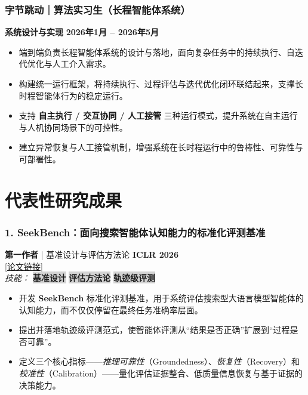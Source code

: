 \documentclass[10pt,a4paper]{article}
\newcommand{\skills}[1]{%
    \noindent\textit{\color{graytext}技能：}%
    \begingroup
    #1%
    \endgroup
}
\newcommand{\skilltag}[1]{%
    \setlength{\fboxsep}{3pt}%
    \setlength{\fboxrule}{0.5pt}%
    \colorbox{lightgray}{\color{itemcolor}\small\textbf{#1}}%
    \hspace{0.3em}%
}
\begin{document}
    \subsubsection*{\color{itemcolor}字节跳动｜算法实习生（长程智能体系统）}
    \noindent\textbf{\color{sectioncolor}系统设计与实现} \hfill \color{accentcolor}\textbf{2026年1月 – 2026年5月}
    \begin{itemize}[leftmargin=*, label=\textcolor{accentcolor}{\textbullet}, itemsep=0.2em]
        \item 端到端负责长程智能体系统的设计与落地，面向复杂任务中的持续执行、自迭代优化与人工介入需求。
        \item 构建统一运行框架，将持续执行、过程评估与迭代优化闭环联结起来，支撑长时程智能体行为的稳定运行。
        \item 支持 \textbf{自主执行 / 交互协同 / 人工接管} 三种运行模式，提升系统在自主运行与人机协同场景下的可控性。
        \item 建立异常恢复与人工接管机制，增强系统在长时程运行中的鲁棒性、可靠性与可部署性。
    \end{itemize}

\section*{\color{sectioncolor}代表性研究成果}

    \subsubsection*{1. \color{itemcolor}SeekBench：面向搜索智能体认知能力的标准化评测基准}
    \noindent\textbf{\color{sectioncolor}第一作者} | 基准设计与评估方法论 \hfill \color{accentcolor}\textbf{ICLR 2026} \\
    \noindent\href{https://arxiv.org/abs/2509.22391}{\color{linkcolor}[论文链接]} \\
    \skills{\skilltag{基准设计} \skilltag{评估方法论} \skilltag{轨迹级评测}} 
    \begin{itemize}[leftmargin=*, label=\textcolor{accentcolor}{\textbullet}, itemsep=0.2em]
        \item 开发 \textbf{SeekBench} 标准化评测基准，用于系统评估搜索型大语言模型智能体的认知能力，而不仅仅停留在最终任务准确率层面。
        \item 提出并落地轨迹级评测范式，使智能体评测从“结果是否正确”扩展到“过程是否可靠”。
        \item 定义三个核心指标——\textit{推理可靠性}（Groundedness）、\textit{恢复性}（Recovery）和\textit{校准性}（Calibration）——量化评估证据整合、低质量信息恢复与基于证据的决策能力。
    \end{itemize}
\end{document}
